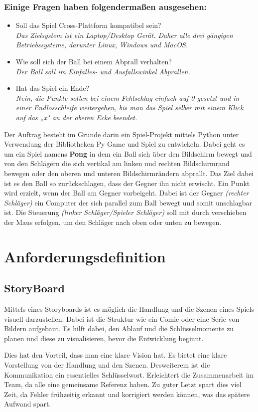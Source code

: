 \documentclass[a4paper,12pt]{article}
\begin{document}
\subsubsection{Einige Fragen haben folgendermaßen ausgesehen:}
\begin{itemize}
    \item Soll das Spiel Cross-Plattform kompatibel sein? \\
    \textit{Das Zielsystem ist ein Laptop/Desktop Gerät. Daher alle drei gängigen Betriebssysteme, darunter Linux, Windows und MacOS.}
    \item Wie soll sich der Ball bei einem Abprall verhalten? \\
    \textit{Der Ball soll im Einfalles- und Ausfallswinkel Abprallen.}
    \item Hat das Spiel ein Ende? \\
    \textit{Nein, die Punkte sollen bei einem Fehlschlag einfach auf 0 gesetzt und in einer Endlosschleife weitergehen, bis man das Spiel selber mit einem Klick auf das „x" an der oberen Ecke beendet.}
\end{itemize}
Der Auftrag besteht im Grunde darin ein Spiel-Projekt mittels Python unter Verwendung der Bibliotheken Py Game und Spiel zu entwickeln. Dabei geht es um ein Spiel namens \textbf{Pong} in dem ein Ball sich über den Bildschirm bewegt und von den Schlägern die sich vertikal am linken und rechten Bildschirmrand bewegen oder den oberen und unteren Bildschirmrändern abprallt. Das Ziel dabei ist es den Ball so zurückschlagen, dass der Gegner ihn nicht erwischt. Ein Punkt wird erzielt, wenn der Ball am Gegner vorbeigeht. Dabei ist der Gegner \textit{(rechter Schläger)} ein Computer der sich parallel zum Ball bewegt und somit unschlagbar ist. Die Steuerung \textit{(linker Schläger/Spieler Schläger)} soll mit durch verschieben der Maus erfolgen, um den Schläger nach oben oder unten zu bewegen.
\clearpage
\section{Anforderungsdefinition}
\subsection{StoryBoard}
Mittels eines Storyboards ist es möglich die Handlung und die Szenen eines Spiels visuell darzustellen. Dabei ist die Struktur wie ein Comic oder eine Serie von Bildern aufgebaut. Es hilft dabei, den Ablauf und die Schlüsselmomente zu planen und diese zu visualisieren, bevor die Entwicklung beginnt. \par\vspace{0.5em} Dies hat den Vorteil, dass man eine klare Vision hat. Es bietet eine klare Vorstellung von der Handlung und den Szenen. Desweiterem ist die Kommunikation ein essentielles Schlüsselwort. Erleichtert die Zusammenarbeit im Team, da alle eine gemeinsame Referenz haben. Zu guter Letzt spart dies viel Zeit, da Fehler frühzeitig erkannt und korrigiert werden können, was das spätere Aufwand spart.
\end{document}
